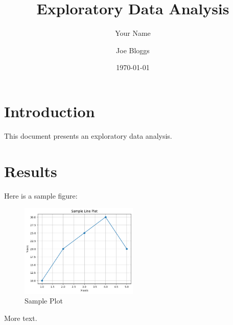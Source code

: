 \documentclass{article}
\title{Exploratory Data Analysis}
\author{Your Name}
\date{\today}
\begin{document}
\author{Joe Bloggs}

\maketitle{}

\section{Introduction}
This document presents an exploratory data analysis.

\section{Results}
Here is a sample figure:

\begin{figure}[h]
    \centering
    \includegraphics[width=0.5\textwidth]{figures/dummy_plot.png}
    \caption{Sample Plot}
    \label{fig:sample_plot}
\end{figure}

\clearpage

More text.
\end{document}
